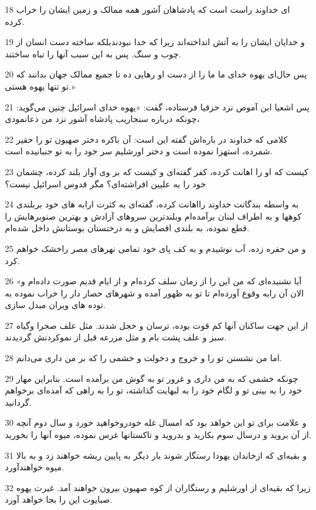 \par 18 ‌ای خداوند راست است که پادشاهان آشور همه ممالک و زمین ایشان را خراب کرده.
\par 19 و خدایان ایشان را به آتش انداخته‌اند زیرا که خدا نبودندبلکه ساخته دست انسان از چوب و سنگ. پس به این سبب آنها را تباه ساختند.
\par 20 پس حال‌ای یهوه خدای ما ما را از دست او رهایی ده تا جمیع ممالک جهان بدانند که تو تنها یهوه هستی.»
\par 21 پس اشعیا ابن آموص نزد حزقیا فرستاده، گفت: «یهوه خدای اسرائیل چنین می‌گوید: چونکه درباره سنحاریب پادشاه آشور نزد من دعانمودی،
\par 22 کلامی که خداوند در باره‌اش گفته این است: آن باکره دختر صهیون تو را حقیر شمرده، استهزا نموده است و دختر اورشلیم سر خود را به تو جنبانیده است.
\par 23 کیست که او را اهانت کرده، کفر گفته‌ای و کیست که بر وی آواز بلند کرده، چشمان خود را به علیین افراشته‌ای؟ مگر قدوس اسرائیل نیست؟
\par 24 به واسطه بندگانت خداوند رااهانت کرده، گفته‌ای به کثرت ارابه های خود بربلندی کوهها و به اطراف لبنان برآمده‌ام وبلندترین سروهای آزادش و بهترین صنوبرهایش را قطع نموده، به بلندی اقصایش و به درختستان بوستانش داخل شده‌ام.
\par 25 و من حفره زده، آب نوشیدم و به کف پای خود تمامی نهرهای مصر راخشک خواهم کرد.
\par 26 «آیا نشنیده‌ای که من این را از زمان سلف کرده‌ام و از ایام قدیم صورت داده‌ام و الان آن رابه وقوع آورده‌ام تا تو به ظهور آمده و شهرهای حصار دار را خراب نموده به توده های ویران مبدل سازی.
\par 27 از این جهت ساکنان آنها کم قوت بوده، ترسان و خجل شدند. مثل علف صحرا وگیاه سبز و علف پشت بام و مثل مزرعه قبل از نموکردنش گردیدند.
\par 28 اما من نشستن تو را و خروج و دخولت و خشمی را که بر من داری می‌دانم.
\par 29 چونکه خشمی که به من داری و غرور تو به گوش من برآمده است. بنابراین مهار خود را به بینی تو و لگام خود را به لبهایت گذاشته، تو را به راهی که آمده‌ای برخواهم گردانید.
\par 30 و علامت برای تو این خواهد بود که امسال غله خودروخواهید خورد و سال دوم آنچه از آن بروید و درسال سوم بکارید و بدروید و تاکستانها غرس نموده، میوه آنها را بخورید.
\par 31 و بقیه‌ای که ازخاندان یهودا رستگار شوند بار دیگر به پایین ریشه خواهند زد و به بالا میوه خواهند‌آورد.
\par 32 زیرا که بقیه‌ای از اورشلیم و رستگاران از کوه صهیون بیرون خواهند آمد. غیرت یهوه صبایوت این را بجا خواهد آورد.
